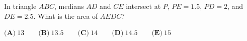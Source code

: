 In triangle $ABC$, medians $AD$ and $CE$ intersect at $P$, $PE=1.5$, $PD=2$, and $DE=2.5$. What is the area of $AEDC$?

$\textbf{(A)}\ 13\qquad\textbf{(B)}\ 13.5\qquad\textbf{(C)}\ 14\qquad\textbf{(D)}\ 14.5\qquad\textbf{(E)}\ 15$

